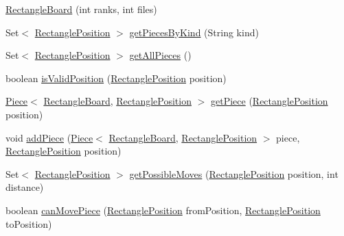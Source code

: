 \begin{DoxyCompactItemize}
\item 
\hyperlink{classedu_1_1xwei12_1_1_chess_1_1_rectangle_board_a3f9653c6d164271b3a4a14a696d11c6b}{Rectangle\+Board} (int ranks, int files)
\item 
Set$<$ \hyperlink{classedu_1_1xwei12_1_1_chess_1_1_rectangle_position}{Rectangle\+Position} $>$ \hyperlink{classedu_1_1xwei12_1_1_chess_1_1_rectangle_board_add16149ce406652d4a7721dae67d7b3a}{get\+Pieces\+By\+Kind} (String kind)
\item 
Set$<$ \hyperlink{classedu_1_1xwei12_1_1_chess_1_1_rectangle_position}{Rectangle\+Position} $>$ \hyperlink{classedu_1_1xwei12_1_1_chess_1_1_rectangle_board_a69af3c03ac604154d46c55be0bfe443a}{get\+All\+Pieces} ()
\item 
boolean \hyperlink{classedu_1_1xwei12_1_1_chess_1_1_rectangle_board_a984db2e12d1974548968327d29785159}{is\+Valid\+Position} (\hyperlink{classedu_1_1xwei12_1_1_chess_1_1_rectangle_position}{Rectangle\+Position} position)
\item 
\hyperlink{classedu_1_1xwei12_1_1_chess_1_1_piece}{Piece}$<$ \hyperlink{classedu_1_1xwei12_1_1_chess_1_1_rectangle_board}{Rectangle\+Board}, \hyperlink{classedu_1_1xwei12_1_1_chess_1_1_rectangle_position}{Rectangle\+Position} $>$ \hyperlink{classedu_1_1xwei12_1_1_chess_1_1_rectangle_board_a6c2ed5a3bf98eab624440a69623c476d}{get\+Piece} (\hyperlink{classedu_1_1xwei12_1_1_chess_1_1_rectangle_position}{Rectangle\+Position} position)
\item 
void \hyperlink{classedu_1_1xwei12_1_1_chess_1_1_rectangle_board_a00fda32214f8eb15c14da962327b6ffa}{add\+Piece} (\hyperlink{classedu_1_1xwei12_1_1_chess_1_1_piece}{Piece}$<$ \hyperlink{classedu_1_1xwei12_1_1_chess_1_1_rectangle_board}{Rectangle\+Board}, \hyperlink{classedu_1_1xwei12_1_1_chess_1_1_rectangle_position}{Rectangle\+Position} $>$ piece, \hyperlink{classedu_1_1xwei12_1_1_chess_1_1_rectangle_position}{Rectangle\+Position} position)
\item 
Set$<$ \hyperlink{classedu_1_1xwei12_1_1_chess_1_1_rectangle_position}{Rectangle\+Position} $>$ \hyperlink{classedu_1_1xwei12_1_1_chess_1_1_rectangle_board_a4f3bf57cca0a201fb45767868cf99204}{get\+Possible\+Moves} (\hyperlink{classedu_1_1xwei12_1_1_chess_1_1_rectangle_position}{Rectangle\+Position} position, int distance)
\item 
boolean \hyperlink{classedu_1_1xwei12_1_1_chess_1_1_rectangle_board_a8d4066cb79758c4800ff50563b54fdd0}{can\+Move\+Piece} (\hyperlink{classedu_1_1xwei12_1_1_chess_1_1_rectangle_position}{Rectangle\+Position} from\+Position, \hyperlink{classedu_1_1xwei12_1_1_chess_1_1_rectangle_position}{Rectangle\+Position} to\+Position)

\end{DoxyCompactItemize}

